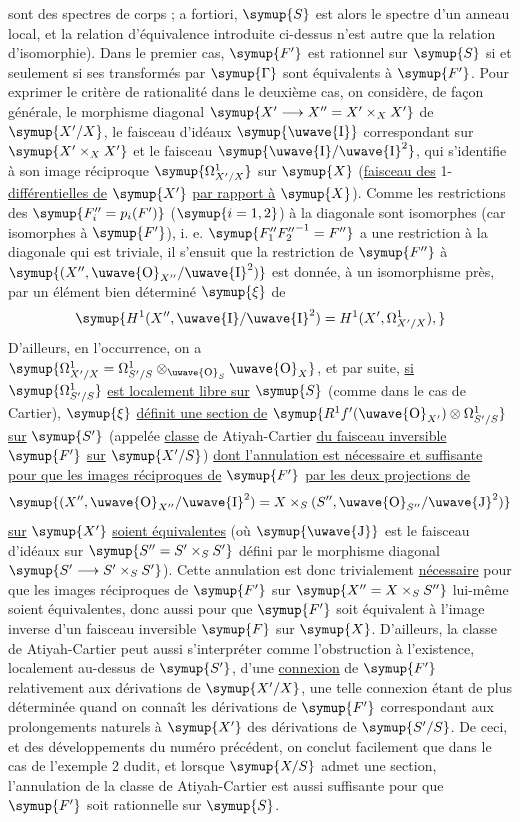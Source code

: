 sont des spectres de corps ; a fortiori, $\symup{S}$ est alors le spectre d'un anneau
local, et la relation d'équivalence introduite ci-dessus n'est autre que la
relation d'isomorphie). Dans le premier cas, $\symup{F'}$ est rationnel sur $\symup{S}$ si et
seulement si ses transformés par $\symup{\Gamma}$ sont équivalents à $\symup{F'}$. Pour
exprimer le critère de rationalité dans le deuxième cas, on considère, de façon
générale, le morphisme diagonal
$\symup{X'\longrightarrow X''=X'\times_XX'}$
de $\symup{X'/X}$, le faisceau d'idéaux $\symup{\text{\uwave{I}}}$ correspondant sur
$\symup{X'\times_XX'}$ et le faisceau $\symup{\text{\uwave{I}}/\text{\uwave{I}}^2}$, qui s'identifie à son
image réciproque $\symup{\Omega^1_{X'/X}}$ sur $\symup{X}$ (\uline{faisceau des} 1-\uline{différentielles de} $\symup{X'}$ \uline{par rapport à} $\symup{X}$). Comme les restrictions des
$\symup{F''_i=p_i(F')}$ ($\symup{i=1,2}$) à la diagonale sont isomorphes (car isomorphes à
$\symup{F'}$), i. e. $\symup{F''_1{F''_2}^{-1}=F''}$ a une restriction à la diagonale qui est
triviale, il s'ensuit que la restriction de $\symup{F''}$ à
$\symup{(X'',\text{\uwave{O}}_{X''}/\text{\uwave{I}}^2)}$ est donnée, à un isomorphisme près, par
un élément bien déterminé $\symup{\xi}$ de
\[
  \symup{H^1(X'',\text{\uwave{I}}/\text{\uwave{I}}^2)
  =H^1(X',\Omega^1_{X'/X}),}
\]
D'ailleurs, en l'occurrence, on a
$\symup{\Omega^1_{X'/X}=\Omega^1_{S'/S}\otimes_{\text{\uwave{O}}_S}\text{\uwave{O}}_X}$,
et par suite, \uline{si} $\symup{\Omega^1_{S'/S}}$ \uline{est localement libre sur} $\symup{S}$ (comme dans le
cas de Cartier), $\symup{\xi}$ \uline{définit une section de}
$\symup{R^1f'(\text{\uwave{O}}_{X'})\otimes\Omega^1_{S'/S}}$
\uline{sur} $\symup{S'}$ (appelée \uline{classe} de Atiyah-Cartier \uline{du faisceau inversible} $\symup{F'}$ \uline{sur}
$\symup{X'/S}$) \uline{dont l'annulation est nécessaire et suffisante pour que les images réciproques de} $\symup{F'}$ \uline{par les deux projections de}
\[
  \symup{(X'',\text{\uwave{O}}_{X''}/\text{\uwave{I}}^2)
  =X\times_S(S'',\text{\uwave{O}}_{S''}/\text{\uwave{J}}^2)}
\]
\uline{sur} $\symup{X'}$ \uline{soient équivalentes} (où $\symup{\text{\uwave{J}}}$ est le faisceau d'idéaux sur
$\symup{S''=S'\times_SS'}$ défini par le morphisme diagonal
$\symup{S'\longrightarrow S'\times_SS'}$). Cette annulation est donc trivialement
\uline{nécessaire} pour que les images réciproques de $\symup{F'}$ sur
$\symup{X''=X\times_SS''}$ lui-même soient équivalentes, donc aussi pour que $\symup{F'}$ soit
équivalent à l'image inverse d'un faisceau inversible $\symup{F}$ sur $\symup{X}$. D'ailleurs,
la classe de Atiyah-Cartier peut aussi s'interpréter comme l'obstruction à
l'existence, localement au-dessus de $\symup{S'}$, d'une \uline{connexion} de $\symup{F'}$ relativement
aux dérivations de $\symup{X'/X}$, une telle connexion étant de plus déterminée quand
on connaît les dérivations de $\symup{F'}$ correspondant aux prolongements naturels à
$\symup{X'}$ des dérivations de $\symup{S'/S}$. De ceci, et des développements du numéro
précédent, on conclut facilement que dans le cas de l'exemple 2 dudit,
et lorsque $\symup{X/S}$ admet une section, l'annulation de la classe de
Atiyah-Cartier est aussi suffisante pour que $\symup{F'}$ soit rationnelle sur $\symup{S}$.

